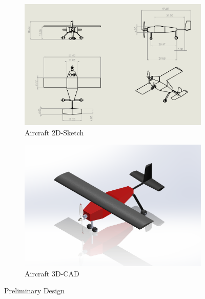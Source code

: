 \begin{figure}[htb!]
    \hspace{\fill}
    \begin{subfigure}[b]{0.49\textwidth}
        \centering
        \includegraphics[width=\textwidth]{Images/goon-2D-2.png}
        \caption{Aircraft 2D-Sketch}
        \label{fig:Aircraft_2D}
    \end{subfigure}
    \hspace{\fill}
    \begin{subfigure}[b]{0.49\textwidth}
        \centering
        \includegraphics[width=\textwidth]{Images/goon-3D.PNG}
        \caption{Aircraft 3D-CAD}
        \label{fig:Aircraft_3D}
    \end{subfigure}
    \hspace{\fill}
    \caption{Preliminary Design}
    \label{fig:score}
    \vspace{1em}
\end{figure}

